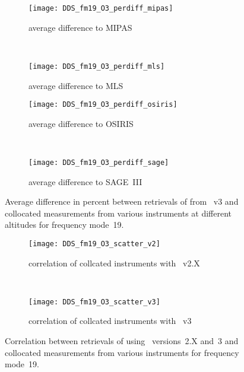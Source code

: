\begin{figure}[tbhp]
    \centering
    \begin{subfigure}[b]{0.49\textwidth}
        \texttt{[image: DDS\_fm19\_O3\_perdiff\_mipas]}
        \caption{average difference to MIPAS}
        \label{fig:fm19:O3:profiles:MIPAS}
    \end{subfigure}
    \,
    \begin{subfigure}[b]{0.49\textwidth}
        \texttt{[image: DDS\_fm19\_O3\_perdiff\_mls]}
        \caption{average difference to MLS}
        \label{fig:fm19:O3:profiles:MLS}
    \end{subfigure}

    \begin{subfigure}[b]{0.49\textwidth}
        \texttt{[image: DDS\_fm19\_O3\_perdiff\_osiris]}
        \caption{average difference to OSIRIS}
        \label{fig:fm19:O3:profiles:OSIRIS}
    \end{subfigure}
    \,
    \begin{subfigure}[b]{0.49\textwidth}
        \texttt{[image: DDS\_fm19\_O3\_perdiff\_sage]}
        \caption{average difference to SAGE~III}
        \label{fig:fm19:O3:profiles:SAGEIII}
    \end{subfigure}
    \caption{Average difference in percent between retrievals of 
    from \smr~v3 and collocated measurements from various instruments at
    different altitudes for frequency mode~19.}

    \label{fig:fm19:O3:profiles}
\end{figure}

\begin{figure}[tbhp]
    \centering
    \begin{subfigure}[b]{0.49\textwidth}
        \texttt{[image: DDS\_fm19\_O3\_scatter\_v2]}
        \caption{correlation of collcated instruments with \smr~v2.X}
        \label{fig:fm19:O3:scatter:v2}
    \end{subfigure}
    \,
    \begin{subfigure}[b]{0.49\textwidth}
        \texttt{[image: DDS\_fm19\_O3\_scatter\_v3]}
        \caption{correlation of collcated instruments with \smr~v3}
        \label{fig:fm19:O3:scatter:v3}
    \end{subfigure}
    \caption{Correlation between retrievals of  using \smr\
    versions~2.X and~3 and collocated measurements from various instruments
    for frequency mode~19.}
    \label{fig:fm19:O3:scatter}
\end{figure}

